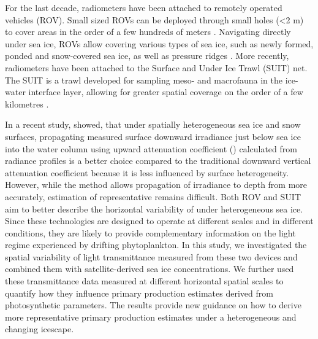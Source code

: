For the last decade, radiometers have been attached to remotely operated vehicles (ROV). Small sized ROVs can be deployed through small holes (\textless 2 m) to cover areas in the order of a few hundreds of meters \citep{Katlein2015, Katlein2017, Ambrose2005, Lund-Hansen2018, Nicolaus2010}. Navigating directly under sea ice, ROVs allow covering various types of sea ice, such as newly formed, ponded and snow-covered sea ice, as well as pressure ridges \citep{Katlein2017}. More recently, radiometers have been attached to the Surface and Under Ice Trawl (SUIT) net. The SUIT is a trawl developed for sampling meso- and macrofauna in the ice-water interface layer, allowing for greater spatial coverage on the order of a few kilometres \citep{Flores2012, Lange2016, Lange2017}.

In a recent study, \citet{Massicotte2018} showed, that under spatially heterogeneous sea ice and snow surfaces, propagating measured surface downward irradiance just below sea ice \edzerominus{} into the water column using upward attenuation coefficient (\klu{}) calculated from radiance profiles is a better choice compared to the traditional downward vertical attenuation coefficient \ked{} because it is less influenced by surface heterogeneity. However, while the method allows propagation of irradiance to depth from \edzerominus{} more accurately, estimation of representative \edzerominus{} remains difficult. Both ROV and SUIT aim to better describe the horizontal variability of \edzerominus{} under heterogeneous sea ice. Since these technologies are designed to operate at different scales and in different conditions, they are likely to provide complementary information on the light regime experienced by drifting phytoplankton. In this study, we investigated the spatial variability of light transmittance measured from these two devices and combined them with satellite-derived sea ice concentrations. We further used these transmittance data measured at different horizontal spatial scales to quantify how they influence primary production estimates derived from photosynthetic parameters. The results provide new guidance on how to derive more representative primary production estimates under a heterogeneous and changing icescape.